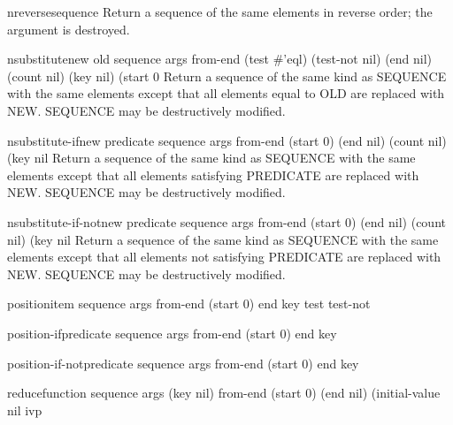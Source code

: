 \begin{function}{nreverse}{sequence}{}
  Return a sequence of the same elements in reverse order; the argument
   is destroyed.
\end{function}

\begin{function}{nsubstitute}{new old sequence \rest args \key from-end (test #'eql) (test-not nil)
 (end nil) (count nil) (key nil) (start 0}{}
  Return a sequence of the same kind as SEQUENCE with the same elements
  except that all elements equal to OLD are replaced with NEW. SEQUENCE
  may be destructively modified.
\end{function}

\begin{function}{nsubstitute-if}{new predicate sequence \rest args \key from-end (start 0) (end nil)
 (count nil) (key nil}{}
  Return a sequence of the same kind as SEQUENCE with the same elements
   except that all elements satisfying PREDICATE are replaced with NEW.
   SEQUENCE may be destructively modified.
\end{function}

\begin{function}{nsubstitute-if-not}{new predicate sequence \rest args \key from-end (start 0) (end nil)
 (count nil) (key nil}{}
  Return a sequence of the same kind as SEQUENCE with the same elements
   except that all elements not satisfying PREDICATE are replaced with NEW.
   SEQUENCE may be destructively modified.
\end{function}

\begin{function}{position}{item sequence \rest args \key from-end (start 0) end key test test-not}{}
  
\end{function}

\begin{function}{position-if}{predicate sequence \rest args \key from-end (start 0) end key}{}
  
\end{function}

\begin{function}{position-if-not}{predicate sequence \rest args \key from-end (start 0) end key}{}
  
\end{function}

\begin{function}{reduce}{function sequence \rest args \key (key nil) from-end (start 0) (end nil)
 (initial-value nil ivp}{}
  
\end{function}

